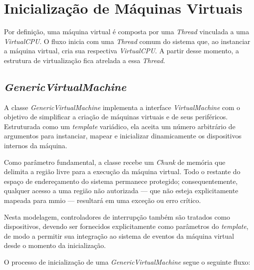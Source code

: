 \section{Inicialização de Máquinas Virtuais}

Por definição, uma máquina virtual é composta por uma \textit{Thread} vinculada a uma \textit{VirtualCPU}.
O fluxo inicia com uma \textit{Thread} comum do sistema que, ao instanciar a máquina virtual, cria sua respectiva \textit{VirtualCPU}.
A partir desse momento, a estrutura de virtualização fica atrelada a essa \textit{Thread}.

\subsection{\textit{GenericVirtualMachine}}

A classe \textit{GenericVirtualMachine} implementa a interface \textit{VirtualMachine} com o objetivo de simplificar a criação de
máquinas virtuais e de seus periféricos. Estruturada como um \textit{template} variádico, ela aceita um número arbitrário de
argumentos para instanciar, mapear e inicializar dinamicamente os dispositivos internos da máquina.

Como parâmetro fundamental, a classe recebe um \textit{Chunk} de memória que delimita a região livre para a execução da máquina virtual.
Todo o restante do espaço de endereçamento do sistema permanece protegido; consequentemente, qualquer acesso a uma região não autorizada
— que não esteja explicitamente mapeada para \gls{mmio} — resultará em uma exceção ou erro crítico.

Nesta modelagem, controladores de interrupção também são tratados como dispositivos,
devendo ser fornecidos explicitamente como parâmetros do \textit{template}, de modo a permitir sua integração ao sistema de eventos
da máquina virtual desde o momento da inicialização.

O processo de inicialização de uma \textit{GenericVirtualMachine} segue o seguinte fluxo:

\vspace{1cm}

